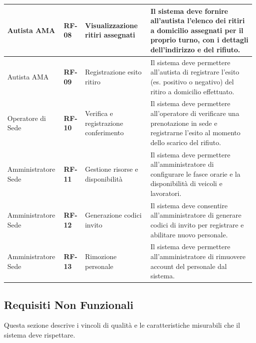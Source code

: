 \begin{center}
\begin{longtable}{|p{3.5cm}|p{1.5cm}|p{4.2cm}|p{6cm}|}
Autista AMA & \textbf{RF-08} & Visualizzazione ritiri assegnati & Il sistema deve fornire all'autista l'elenco dei ritiri a domicilio assegnati per il proprio turno, con i dettagli dell'indirizzo e del rifiuto. \\ \hline

Autista AMA & \textbf{RF-09} & Registrazione esito ritiro & Il sistema deve permettere all'autista di registrare l'esito (es. positivo o negativo) del ritiro a domicilio effettuato. \\ \hline

Operatore di Sede & \textbf{RF-10} & Verifica e registrazione conferimento & Il sistema deve permettere all'operatore di verificare una prenotazione in sede e registrarne l'esito al momento dello scarico del rifiuto. \\ \hline

Amministratore Sede & \textbf{RF-11} & Gestione risorse e disponibilità & Il sistema deve permettere all'amministratore di configurare le fasce orarie e la disponibilità di veicoli e lavoratori. \\ \hline

Amministratore Sede & \textbf{RF-12} & Generazione codici invito & Il sistema deve consentire all'amministratore di generare codici di invito per registrare e abilitare nuovo personale. \\ \hline

Amministratore Sede & \textbf{RF-13} & Rimozione personale & Il sistema deve permettere all'amministratore di rimuovere account del personale dal sistema. \\ \hline
\end{longtable}
\end{center}

\subsection{Requisiti Non Funzionali}
Questa sezione descrive i vincoli di qualità e le caratteristiche misurabili che il sistema deve rispettare.

